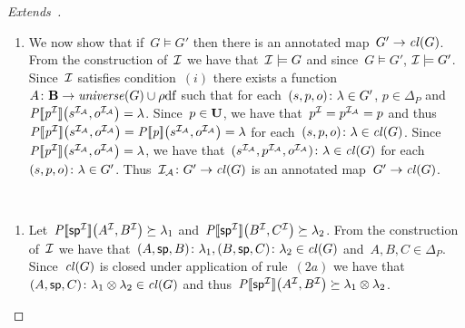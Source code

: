 \begin{proof}[Extends~\citep{MunozPerezGutierrez:2009aa}]
\begin{description}[nosep]
\begin{enumerate}[label=(\alph*),nosep]
    \item We now show that if~$G \models G'$ then there is an annotated map~$G' \to \mathit{cl}\!\left(G\right)$.  From the construction
      of~$\mathcal{I}$ we have that~$\mathcal{I} \models G$ and since~$G \models G'$, $\mathcal{I} \models G'$.  Since~$\mathcal{I}$ satisfies
      condition~$(i)$ there exists a function~$A \colon \mathbf{B} \to \mathit{\mathit{universe}}\!\left(G\right)\cup\mbox{$\rho$df}$ such that for
      each~$\mbox{$(s,p,o)\colon\lambda$} \in G'$, $p\in\Delta_P$ and~$\mathit{{P[\![{p}^{\mathcal{I}}]\!]}}\!\left({s}^{\mathcal{I}_{\mathcal{A}}}, {o}^{\mathcal{I}_{\mathcal{A}}}\right) =
      \lambda$.  Since~$p\in\mathbf{U}$, we have that~${p}^{\mathcal{I}} = {p}^{\mathcal{I}_{\mathcal{A}}} = p$ and thus~$\mathit{{P[\![{p}^{\mathcal{I}}]\!]}}\!\left({s}^{\mathcal{I}_{\mathcal{A}}},
        {o}^{\mathcal{I}_{\mathcal{A}}}\right) = \mathit{{P[\![p]\!]}}\!\left({s}^{\mathcal{I}_{\mathcal{A}}}, {o}^{\mathcal{I}_{\mathcal{A}}}\right) = \lambda$ for each~$\mbox{$(s,p,o)\colon\lambda$} \in
      \mathit{cl}\!\left(G\right)$.
      Since~$\mathit{{P[\![{p}^{\mathcal{I}}]\!]}}\!\left({s}^{\mathcal{I}_{\mathcal{A}}}, {o}^{\mathcal{I}_{\mathcal{A}}}\right) = \lambda$, we have
      that~$\mbox{$({s}^{\mathcal{I}_{\mathcal{A}}},{p}^{\mathcal{I}_{\mathcal{A}}},{o}^{\mathcal{I}_{\mathcal{A}}})\colon\lambda$} \in\mathit{cl}\!\left(G\right)$ for
      each~$\mbox{$(s,p,o)\colon\lambda$} \in G'$.
      Thus~$\mathcal{I}_{\mathcal{A}} \colon G' \to \mathit{cl}\!\left(G\right)$ is an annotated map~$G' \to \mathit{cl}\!\left(G\right)$.
    \end{enumerate}
  \item[Subproperty:]~ 
    \begin{enumerate}[label=(\alph*),nosep]
    \item Let~$\mathit{{P[\![{\mathsf{sp}}^{\mathcal{I}}]\!]}}\!\left({A}^{\mathcal{I}}, {B}^{\mathcal{I}}\right) \succeq \lambda_{1}$ and~$\mathit{{P[\![{\mathsf{sp}}^{\mathcal{I}}]\!]}}\!\left({B}^{\mathcal{I}},
        {C}^{\mathcal{I}}\right) \succeq \lambda_{2}$.
      From the construction of~$\mathcal{I}$ we have that~$\mbox{$(A,\mathsf{sp},B)\colon\lambda_{1}$},
      \mbox{$(B,\mathsf{sp},C)\colon\lambda_{2}$} \in \mathit{cl}\!\left(G\right)$ and~$A,B,C \in \Delta_P$.  Since~$\mathit{cl}\!\left(G\right)$ is closed
      under application of rule~$(2a)$ we have that~$\mbox{$(A,\mathsf{sp},C)\colon\lambda_{1} \otimes \lambda_{2}$} \in
      \mathit{cl}\!\left(G\right)$ and thus~$\mathit{{P[\![{\mathsf{sp}}^{\mathcal{I}}]\!]}}\!\left({A}^{\mathcal{I}}, {B}^{\mathcal{I}}\right) \succeq \lambda_{1} \otimes \lambda_{2}$.


\end{enumerate}
\end{description}
\end{proof}
